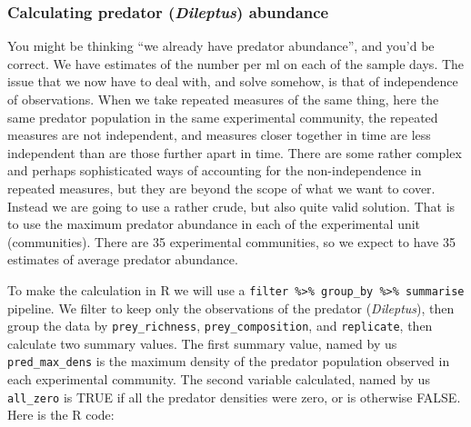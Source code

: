 \documentclass[]{book}
\newenvironment{Shaded}{\begin{snugshade}}{\end{snugshade}}
\newcommand{\DataTypeTok}[1]{\textcolor[rgb]{0.13,0.29,0.53}{#1}}
\newcommand{\DecValTok}[1]{\textcolor[rgb]{0.00,0.00,0.81}{#1}}
\newcommand{\KeywordTok}[1]{\textcolor[rgb]{0.13,0.29,0.53}{\textbf{#1}}}
\newcommand{\NormalTok}[1]{#1}
\newcommand{\OperatorTok}[1]{\textcolor[rgb]{0.81,0.36,0.00}{\textbf{#1}}}
\newcommand{\StringTok}[1]{\textcolor[rgb]{0.31,0.60,0.02}{#1}}
\begin{document}
\hypertarget{calculating-predator-dileptus-abundance}{%
\subsubsection{\texorpdfstring{Calculating predator (\emph{Dileptus}) abundance}{Calculating predator (Dileptus) abundance}}\label{calculating-predator-dileptus-abundance}}

You might be thinking ``we already have predator abundance'', and you'd be correct. We have estimates of the number per ml on each of the sample days. The issue that we now have to deal with, and solve somehow, is that of independence of observations. When we take repeated measures of the same thing, here the same predator population in the same experimental community, the repeated measures are not independent, and measures closer together in time are less independent than are those further apart in time. There are some rather complex and perhaps sophisticated ways of accounting for the non-independence in repeated measures, but they are beyond the scope of what we want to cover. Instead we are going to use a rather crude, but also quite valid solution. That is to use the maximum predator abundance in each of the experimental unit (communities). There are 35 experimental communities, so we expect to have 35 estimates of average predator abundance.

To make the calculation in R we will use a \texttt{filter\ \%\textgreater{}\%\ group\_by\ \%\textgreater{}\%\ summarise} pipeline. We filter to keep only the observations of the predator (\emph{Dileptus}), then group the data by \texttt{prey\_richness}, \texttt{prey\_composition}, and \texttt{replicate}, then calculate two summary values. The first summary value, named by us \texttt{pred\_max\_dens} is the maximum density of the predator population observed in each experimental community. The second variable calculated, named by us \texttt{all\_zero} is TRUE if all the predator densities were zero, or is otherwise FALSE. Here is the R code:

\begin{Shaded}
\end{Shaded}
\end{document}
